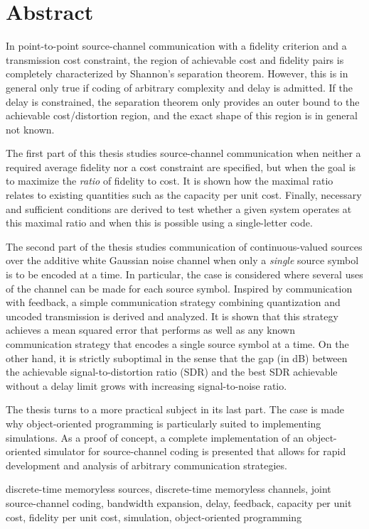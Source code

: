 \chapter*{Abstract}


In point-to-point source-channel communication with a fidelity criterion and a
transmission cost constraint, the region of achievable cost and fidelity pairs
is completely characterized by Shannon's separation theorem. However, this is in
general only true if coding of arbitrary complexity and delay is admitted. If
the delay is constrained, the separation theorem only provides an outer bound to
the achievable cost\slash distortion region, and the exact shape of this region
is in general not known.

The first part of this thesis studies source-channel communication when neither
a required average fidelity nor a cost constraint are specified, but when the
goal is to maximize the \emph{ratio} of fidelity to cost. It is shown how the
maximal ratio relates to existing quantities such as the capacity per unit cost.
Finally, necessary and sufficient conditions are derived to test whether a given
system operates at this maximal ratio and when this is possible using a
single-letter code. 

The second part of the thesis studies communication of continuous-valued
sources over the additive white Gaussian noise channel when only a \emph{single}
source symbol is to be encoded at a time. In particular, the case is considered
where several uses of the channel can be made for each source symbol. Inspired
by communication with feedback, a simple communication strategy combining
quantization and uncoded transmission is derived and analyzed. It is shown that
this strategy achieves a mean squared error that performs as well as any known
communication strategy that encodes a single source symbol at a time. On the
other hand, it is strictly suboptimal in the sense that the gap (in dB) between
the achievable signal-to-distortion ratio (SDR) and the best SDR achievable
without a delay limit grows with increasing signal-to-noise ratio. 

The thesis turns to a more practical subject in its last part. The case is made
why object-oriented programming is particularly suited to implementing
simulations. As a proof of concept, a complete implementation of an
object-oriented simulator for source-channel coding is presented that allows for
rapid development and analysis of arbitrary communication strategies.

\begin{keywords}
  discrete-time memoryless sources, discrete-time memoryless channels, joint
  source-channel coding, bandwidth expansion, delay, feedback, capacity per
  unit cost, fidelity per unit cost, simulation, object-oriented programming
\end{keywords}
